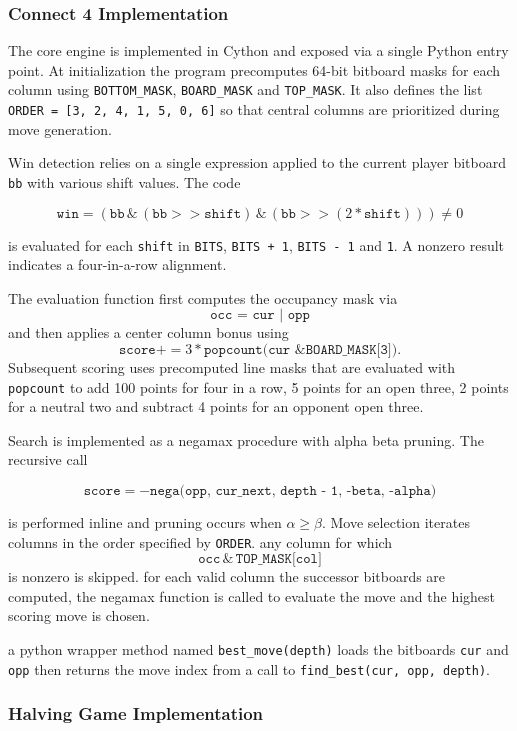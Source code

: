\documentclass[12pt]{article}
\begin{document}
\subsubsection{Connect 4 Implementation}

The core engine is implemented in Cython and exposed via a single Python entry point. At initialization the program precomputes 64-bit bitboard masks for each column using \texttt{BOTTOM\_MASK}, \texttt{BOARD\_MASK} and \texttt{TOP\_MASK}. It also defines the list \texttt{ORDER = [3, 2, 4, 1, 5, 0, 6]} so that central columns are prioritized during move generation.

Win detection relies on a single expression applied to the current player bitboard \texttt{bb} with various shift values. The code

\[
\texttt{win} = (\texttt{bb} \,\&\, (\texttt{bb} >> \texttt{shift}) \,\&\, (\texttt{bb} >> (2 * \texttt{shift}))) \neq 0
\]

is evaluated for each \texttt{shift} in \texttt{BITS}, \texttt{BITS + 1}, \texttt{BITS - 1} and \texttt{1}. A nonzero result indicates a four-in-a-row alignment.

The evaluation function first computes the occupancy mask via
\[
\texttt{occ = cur | opp}
\]
and then applies a center column bonus using
\[
\texttt{score} += 3 * \texttt{popcount(cur \& BOARD\_MASK[3])}.
\]
Subsequent scoring uses precomputed line masks that are evaluated with \texttt{popcount} to add 100 points for four in a row, 5 points for an open three, 2 points for a neutral two and subtract 4 points for an opponent open three.

Search is implemented as a negamax procedure with alpha beta pruning. The recursive call

\[
\texttt{score} = -\texttt{nega(opp, cur\_next, depth - 1, -beta, -alpha)}
\]

is performed inline and pruning occurs when \(\alpha \ge \beta\). Move selection iterates columns in the order specified by \texttt{ORDER}. any column for which
\[
\texttt{occ} \,\&\, \texttt{TOP\_MASK[col]}
\]
is nonzero is skipped. for each valid column the successor bitboards are computed, the negamax function is called to evaluate the move and the highest scoring move is chosen.

a python wrapper method named \texttt{best\_move(depth)} loads the bitboards \texttt{cur} and \texttt{opp} then returns the move index from a call to \texttt{find\_best(cur, opp, depth)}.

\subsubsection{Halving Game Implementation}
\end{document}

